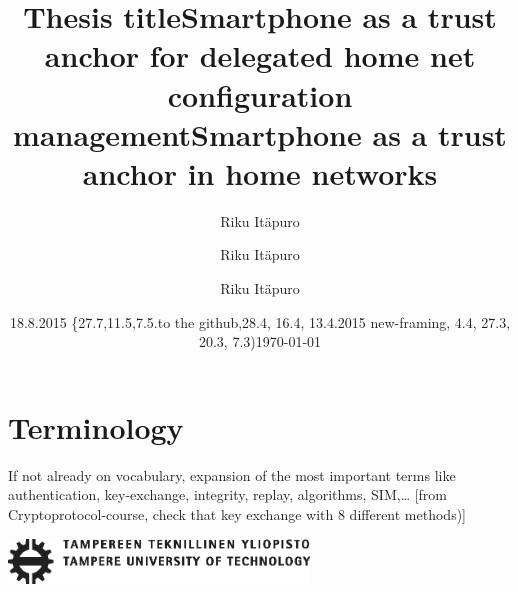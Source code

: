 \documentclass[12pt,a4paper,english]{tutthesis}
\author{Riku Itäpuro}
\title{Thesis title}      %
\author{Riku Itäpuro}
\title{Smartphone as a trust anchor for delegated home net configuration management}
\author{Riku Itäpuro}
\date{18.8.2015  \{27.7,11.5,7.5.to the github,28.4, 16.4, 13.4.2015 new-framing, 4.4, 27.3,  20.3, 7.3)}
\title{Smartphone as a trust anchor in home networks}
\begin{document}
\maketitle



\chapter*{Terminology}
\markboth{}{}                                %

If not already on vocabulary, expansion of the most important terms like
authentication, key-exchange, integrity, replay, algorithms, SIM,\ldots{}
[from Cryptoprotocol-course, check that key exchange with 8 different methods)]

\newpage             %

 \pagestyle{headings}
 \thispagestyle{empty}
\date\today
 \vspace*{-.5cm}\noindent
 \includegraphics[width=8cm]{tty_tut_logo}   %

\vspace{6.8cm}
\maketitle
\vspace{6.7cm} %
\end{document}
